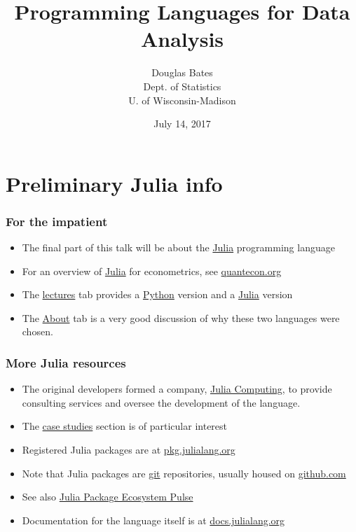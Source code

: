 \documentclass[pdf]{beamer}
\title{Programming Languages for Data Analysis}
\date{July 14, 2017}
\author{Douglas Bates\\Dept. of Statistics\\U. of Wisconsin-Madison}
\begin{document}
  \begin{frame}
    \maketitle
  \end{frame}

  \section{Preliminary Julia info}

  \begin{frame}\frametitle{For the impatient}
    \begin{itemize}
      \pause
      \item The final part of this talk will be about the
      \href{https://julialang.org}{Julia} programming language
      \pause
      \item For an overview of \href{https:julialang.org}{Julia} for econometrics,
      see \href{https://quantecon.org}{quantecon.org}
      \pause
      \item The \href{https://lectures.quantecon.org/}{lectures} tab provides a
      \href{https://python.org}{Python} version and a
      \href{https://julialang.org}{Julia} version
      \pause
      \item The \href{https://lectures.quantecon.org/about_lectures.html}{About}
      tab is a very good discussion of why these two languages were
      chosen.
    \end{itemize}
  \end{frame}

  \begin{frame}\frametitle{More Julia resources}
    \begin{itemize}
      \pause
      \item The original developers formed a company,
      \href{https://juliacomputing.com}{Julia Computing}, to provide
      consulting services and oversee the development of the language.
      \pause
      \item The \href{https://juliacomputing.com/case-studies/}{case studies}
      section is of particular interest
      \pause
      \item Registered Julia packages are at
      \href{https://pkg.julialang.org}{pkg.julialang.org}
      \pause
      \item Note that Julia packages are
      \href{https://en.wikipedia.org/wiki/Git}{git} repositories, usually
      housed on \href{http://github.com}{github.com}
      \pause
      \item See also
      \href{https://pkg.julialang.org/pulse.html}{Julia Package Ecosystem Pulse}
      \pause
      \item Documentation for the language itself is at
      \href{https://docs.julialang.org}{docs.julialang.org}
    \end{itemize}
  \end{frame}
\end{document}
